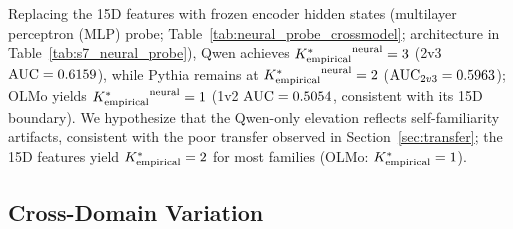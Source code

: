 Replacing the 15D features with frozen encoder hidden states (multilayer perceptron (MLP) probe; Table~\ref{tab:neural_probe_crossmodel}; architecture in Table~\ref{tab:s7_neural_probe}), Qwen achieves ${K^*_{\text{empirical}}}^{\text{neural}} = 3$ (2v3 $\text{AUC} = 0.6159$), while Pythia remains at ${K^*_{\text{empirical}}}^{\text{neural}} = 2$ ($\text{AUC}_{2v3} = 0.5963$); OLMo yields ${K^*_{\text{empirical}}}^{\text{neural}} = 1$ (1v2 $\text{AUC} = 0.5054$, consistent with its 15D boundary).
We hypothesize that the Qwen-only elevation reflects self-familiarity artifacts, consistent with the poor transfer observed in Section~\ref{sec:transfer}; the 15D features yield ${K^*_{\text{empirical}}} = 2$ for most families (OLMo: ${K^*_{\text{empirical}}} = 1$).

\begin{table}[t]
\centering
\footnotesize
\caption{Neural probe pairwise AUC using frozen-encoder MLP. Each cell reports AUC for classifying depth $d$ vs.\ $d{+}1$ text. $\Kempirical^{\text{neural}}$: maximum depth where AUC exceeds $\theta = 0.60$.}
\label{tab:neural_probe_crossmodel}
\end{table}

\subsection{Cross-Domain Variation}
\label{sec:cross_domain}

